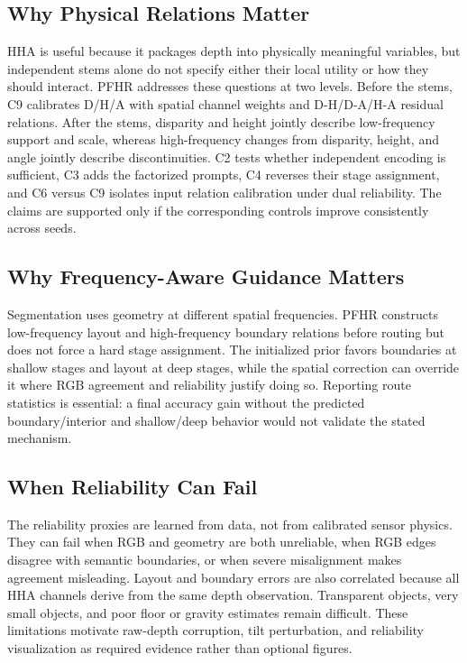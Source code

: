 \documentclass[a4paper,fleqn]{cas-dc}
\begin{document}
\subsection{Why Physical Relations Matter}

HHA is useful because it packages depth into physically meaningful variables, but independent stems alone do not specify either their local utility or how they should interact. PFHR addresses these questions at two levels. Before the stems, C9 calibrates D/H/A with spatial channel weights and D-H/D-A/H-A residual relations. After the stems, disparity and height jointly describe low-frequency support and scale, whereas high-frequency changes from disparity, height, and angle jointly describe discontinuities. C2 tests whether independent encoding is sufficient, C3 adds the factorized prompts, C4 reverses their stage assignment, and C6 versus C9 isolates input relation calibration under dual reliability. The claims are supported only if the corresponding controls improve consistently across seeds.

\subsection{Why Frequency-Aware Guidance Matters}

Segmentation uses geometry at different spatial frequencies. PFHR constructs low-frequency layout and high-frequency boundary relations before routing but does not force a hard stage assignment. The initialized prior favors boundaries at shallow stages and layout at deep stages, while the spatial correction can override it where RGB agreement and reliability justify doing so. Reporting route statistics is essential: a final accuracy gain without the predicted boundary/interior and shallow/deep behavior would not validate the stated mechanism.

\subsection{When Reliability Can Fail}

The reliability proxies are learned from data, not from calibrated sensor physics. They can fail when RGB and geometry are both unreliable, when RGB edges disagree with semantic boundaries, or when severe misalignment makes agreement misleading. Layout and boundary errors are also correlated because all HHA channels derive from the same depth observation. Transparent objects, very small objects, and poor floor or gravity estimates remain difficult. These limitations motivate raw-depth corruption, tilt perturbation, and reliability visualization as required evidence rather than optional figures.
\end{document}
